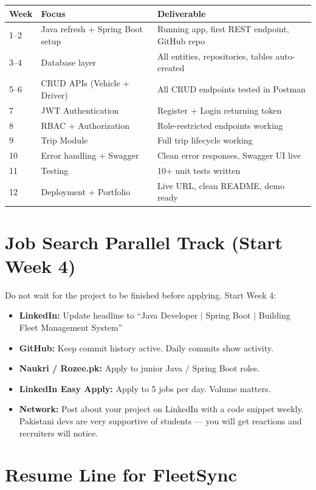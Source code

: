 \documentclass[12pt,a4paper]{report}
\begin{document}
\begin{tabularx}{\textwidth}{@{}lXX@{}}
\toprule
\textbf{Week} & \textbf{Focus} & \textbf{Deliverable} \\
\midrule
1--2 & Java refresh + Spring Boot setup & Running app, first REST endpoint, GitHub repo \\
3--4 & Database layer & All entities, repositories, tables auto-created \\
5--6 & CRUD APIs (Vehicle + Driver) & All CRUD endpoints tested in Postman \\
7 & JWT Authentication & Register + Login returning token \\
8 & RBAC + Authorization & Role-restricted endpoints working \\
9 & Trip Module & Full trip lifecycle working \\
10 & Error handling + Swagger & Clean error responses, Swagger UI live \\
11 & Testing & 10+ unit tests written \\
12 & Deployment + Portfolio & Live URL, clean README, demo ready \\
\bottomrule
\end{tabularx}

\section{Job Search Parallel Track (Start Week 4)}

Do not wait for the project to be finished before applying. Start Week 4:

\begin{itemize}
  \item \textbf{LinkedIn:} Update headline to ``Java Developer $|$ Spring Boot $|$ Building Fleet Management System''
  \item \textbf{GitHub:} Keep commit history active. Daily commits show activity.
  \item \textbf{Naukri / Rozee.pk:} Apply to junior Java / Spring Boot roles.
  \item \textbf{LinkedIn Easy Apply:} Apply to 5 jobs per day. Volume matters.
  \item \textbf{Network:} Post about your project on LinkedIn with a code snippet weekly. Pakistani devs are very supportive of students --- you will get reactions and recruiters will notice.
\end{itemize}

\section{Resume Line for FleetSync}
\end{document}
